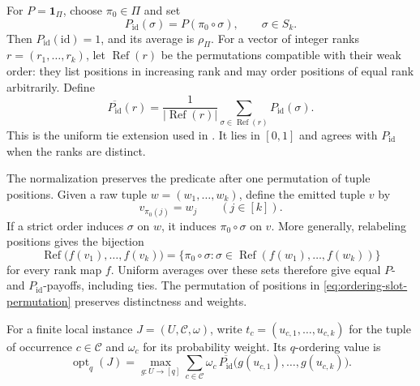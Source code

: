 For \(P=\mathbf1_\Pi\), choose \(\pi_0\in\Pi\) and set
\[
 P_{\mathrm{id}}(\sigma)=P(\pi_0\circ\sigma),\qquad \sigma\in S_k.
\]
Then \(P_{\mathrm{id}}(\mathrm{id})=1\), and its average is \(\rho_\Pi\).
For a vector of integer ranks \(r=(r_1,\ldots,r_k)\), let
\(\operatorname{Ref}(r)\) be the permutations compatible with their
weak order: they list positions in increasing rank and may order
positions of equal rank arbitrarily.  Define
\begin{equation}
 \overline{P_{\mathrm{id}}}(r)=
 \frac1{|\operatorname{Ref}(r)|}
 \sum_{\sigma\in\operatorname{Ref}(r)}P_{\mathrm{id}}(\sigma).
\label{eq:ordering-tie-payoff}
\end{equation}
This is the uniform tie extension used in
\cite[Section~8.2]{GuruswamiEtAl2011OrderingCSP}.  It lies in
\([0,1]\) and agrees with \(P_{\mathrm{id}}\) when the ranks are distinct.

The normalization preserves the predicate after one permutation of
tuple positions.  Given a raw tuple \(w=(w_1,\ldots,w_k)\), define
the emitted tuple \(v\) by
\begin{equation}
 v_{\pi_0(j)}=w_j\qquad(j\in[k]).
\label{eq:ordering-slot-permutation}
\end{equation}
If a strict order induces \(\sigma\) on \(w\), it induces
\(\pi_0\circ\sigma\) on \(v\).  More generally, relabeling positions
gives the bijection
\[
 \operatorname{Ref}\bigl(f(v_1),\ldots,f(v_k)\bigr)
 =
 \{\pi_0\circ\sigma:
       \sigma\in\operatorname{Ref}(f(w_1),\ldots,f(w_k))\}
\]
for every rank map \(f\).  Uniform averages over these sets therefore
give equal \(P\)- and \(P_{\mathrm{id}}\)-payoffs, including ties.  The permutation
of positions in \eqref{eq:ordering-slot-permutation} preserves
distinctness and weights.

For a finite local instance \(J=(U,\mathcal C,\omega)\), write
\(t_c=(u_{c,1},\ldots,u_{c,k})\) for the tuple of occurrence
\(c\in\mathcal C\) and \(\omega_c\) for its probability weight.
Its \(q\)-ordering value is
\[
 \operatorname{opt}_q(J)=
 \max_{g:U\to[q]}
 \sum_{c\in\mathcal C}\omega_c\,
 \overline{P_{\mathrm{id}}}\bigl(g(u_{c,1}),\ldots,g(u_{c,k})\bigr).
\]

